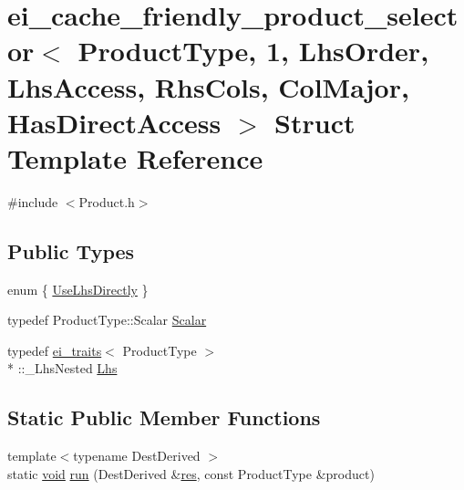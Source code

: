 \hypertarget{structei__cache__friendly__product__selector_3_01_product_type_00_011_00_01_lhs_order_00_01_lhs_7baad95154c59093f09d002bad31c6a0}{\section{ei\-\_\-cache\-\_\-friendly\-\_\-product\-\_\-selector$<$ Product\-Type, 1, Lhs\-Order, Lhs\-Access, Rhs\-Cols, Col\-Major, Has\-Direct\-Access $>$ Struct Template Reference}
\label{structei__cache__friendly__product__selector_3_01_product_type_00_011_00_01_lhs_order_00_01_lhs_7baad95154c59093f09d002bad31c6a0}
}


{\ttfamily \#include $<$Product.\-h$>$}

\subsection*{Public Types}
\begin{DoxyCompactItemize}
\item 
enum \{ \hyperlink{structei__cache__friendly__product__selector_3_01_product_type_00_011_00_01_lhs_order_00_01_lhs_7baad95154c59093f09d002bad31c6a0_aff897e7a6a1c253fd7c7a00d3b920767aa9d77fd89cf9287bcc6b0d9057a35415}{Use\-Lhs\-Directly}
 \}
\item 
typedef Product\-Type\-::\-Scalar \hyperlink{structei__cache__friendly__product__selector_3_01_product_type_00_011_00_01_lhs_order_00_01_lhs_7baad95154c59093f09d002bad31c6a0_acb3b8ef814cc369e548d8bb73106c4fb}{Scalar}
\item 
typedef \hyperlink{structei__traits}{ei\-\_\-traits}$<$ Product\-Type $>$\\*
\-::\-\_\-\-Lhs\-Nested \hyperlink{structei__cache__friendly__product__selector_3_01_product_type_00_011_00_01_lhs_order_00_01_lhs_7baad95154c59093f09d002bad31c6a0_a495829a2927358ebeb2a208fbbc0b648}{Lhs}
\end{DoxyCompactItemize}
\subsection*{Static Public Member Functions}
\begin{DoxyCompactItemize}
\item 
{\footnotesize template$<$typename Dest\-Derived $>$ }\\static \hyperlink{group___u_a_v_objects_plugin_ga444cf2ff3f0ecbe028adce838d373f5c}{void} \hyperlink{structei__cache__friendly__product__selector_3_01_product_type_00_011_00_01_lhs_order_00_01_lhs_7baad95154c59093f09d002bad31c6a0_afb2c6038be7fcf410de2122538db84fd}{run} (Dest\-Derived \&\hyperlink{glext_8h_a1dbb21208b9047cc8031ca9c840d3c2f}{res}, const Product\-Type \&product)
\end{DoxyCompactItemize}


